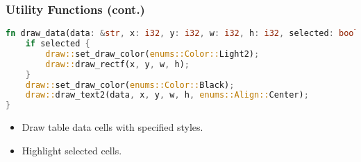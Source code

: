 \documentclass[aspectratio=169, table]{beamer}
\begin{document}
\begin{frame}[fragile]
\frametitle{Utility Functions (cont.)}
\begin{lstlisting}[language=Rust]
fn draw_data(data: &str, x: i32, y: i32, w: i32, h: i32, selected: bool) {
	if selected {
		draw::set_draw_color(enums::Color::Light2);
		draw::draw_rectf(x, y, w, h);
	}
	draw::set_draw_color(enums::Color::Black);
	draw::draw_text2(data, x, y, w, h, enums::Align::Center);
}
\end{lstlisting}
\begin{itemize}
\item Draw table data cells with specified styles.
\item Highlight selected cells.
\end{itemize}
\end{frame}
\end{document}
